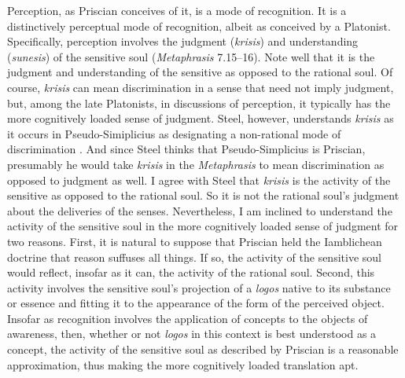 \documentclass[12pt]{article}
\begin{document}
Perception, as Priscian conceives of it, is a mode of recognition. It is a distinctively perceptual mode of recognition, albeit as conceived by a Platonist. Specifically, perception involves the judgment (\emph{krisis}) and understanding (\emph{sunesis}) of the sensitive soul (\emph{Metaphrasis} 7.15--16). Note well that it is the judgment and understanding of the sensitive as opposed to the rational soul. Of course, \emph{krisis} can mean discrimination in a sense that need not imply judgment, but, among the late Platonists, in discussions of perception, it typically has the more cognitively loaded sense of judgment. Steel, however, understands \emph{krisis} as it occurs in Pseudo-Simiplicius as designating a non-rational mode of discrimination \citep[see Lautner's note in][222 n.131]{Sorabji:1997ly}. And since Steel thinks that Pseudo-Simplicius is Priscian, presumably he would take \emph{krisis} in the \emph{Metaphrasis} to mean discrimination as opposed to judgment as well. I agree with Steel that \emph{krisis} is the activity of the sensitive as opposed to the rational soul. So it is not the rational soul's judgment about the deliveries of the senses. Nevertheless, I am inclined to understand the activity of the sensitive soul in the more cognitively loaded sense of judgment for two reasons. First, it is natural to suppose that Priscian held the Iamblichean doctrine that reason suffuses all things. If so, the activity of the sensitive soul would reflect, insofar as it can, the activity of the rational soul. Second, this activity involves the sensitive soul's projection of a \emph{logos} native to its substance or essence and fitting it to the appearance of the form of the perceived object. Insofar as recognition involves the application of concepts to the objects of awareness, then, whether or not \emph{logos} in this context is best understood as a concept, the activity of the sensitive soul as described by Priscian is a reasonable approximation, thus making the more cognitively loaded translation apt.
\end{document}
